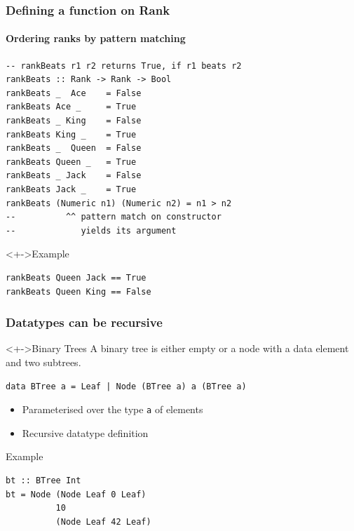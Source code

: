 \documentclass{beamer}
\begin{document}
\begin{frame}[fragile]
  \frametitle{Defining a function on Rank}
  \framesubtitle{Ordering ranks by pattern matching}
\begin{lstlisting}
-- rankBeats r1 r2 returns True, if r1 beats r2
rankBeats :: Rank -> Rank -> Bool
rankBeats _  Ace    = False
rankBeats Ace _     = True
rankBeats _ King    = False
rankBeats King _    = True
rankBeats _  Queen  = False
rankBeats Queen _   = True
rankBeats _ Jack    = False
rankBeats Jack _    = True
rankBeats (Numeric n1) (Numeric n2) = n1 > n2
--          ^^ pattern match on constructor
--             yields its argument
\end{lstlisting}

  \begin{exampleblock}<+->{Example}
\begin{lstlisting}
rankBeats Queen Jack == True
rankBeats Queen King == False
\end{lstlisting}
  \end{exampleblock}
\end{frame}
\begin{frame}[fragile]
  \frametitle{Datatypes can be recursive}
  \begin{block}<+->{Binary Trees}
    A binary tree is either
    \alert{empty} or  a \alert{node with a data element and two subtrees}.
\begin{lstlisting}
data BTree a = Leaf | Node (BTree a) a (BTree a)
\end{lstlisting}
  \begin{itemize}
  \item Parameterised over the type \lstinline{a} of elements
  \item Recursive datatype definition
  \end{itemize}
\end{block}
\begin{exampleblock}{Example}
  \begin{minipage}{0.45\linewidth}
\begin{lstlisting}
bt :: BTree Int
bt = Node (Node Leaf 0 Leaf)
          10
          (Node Leaf 42 Leaf)
\end{lstlisting}
  \end{minipage}
  \begin{minipage}{0.45\linewidth}
    \begin{center}
    \end{center}
  \end{minipage}
    
\end{exampleblock}
\end{frame}
\end{document}
